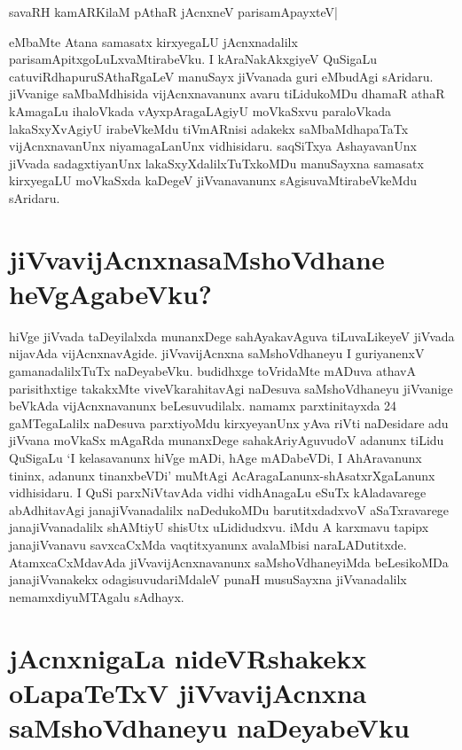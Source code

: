 \begin{shloka}
savaRH kamARKilaM pAthaR jAcnxneV parisamApayxteV|\label{78}
\end{shloka}

eMbaMte Atana samasatx kirxyegaLU jAcnxnadalilx parisamApitxgoLuLxvaMtirabeVku. I kAraNakAkxgiyeV QuSigaLu catuviRdhapuruSAthaRgaLeV manuSayx jiVvanada guri eMbudAgi sAridaru. jiVvanige saMbaMdhisida vijAcnxnavanunx avaru tiLidukoMDu dhamaR athaR kAmagaLu ihaloVkada vAyxpAragaLAgiyU moVkaSxvu paraloVkada lakaSxyXvAgiyU irabeVkeMdu tiVmARnisi adakekx saMbaMdhapaTaTx vijAcnxnavanUnx niyamagaLanUnx vidhisidaru. saqSiTxya AshayavanUnx jiVvada sadagxtiyanUnx lakaSxyXdalilxTuTxkoMDu manuSayxna samasatx kirxyegaLU moVkaSxda kaDegeV jiVvanavanunx sAgisuvaMtirabeVkeMdu sAridaru.

\section*{jiVvavijAcnxnasaMshoVdhane heVgAgabeVku?}

hiVge jiVvada taDeyilalxda munanxDege sahAyakavAguva tiLuvaLikeyeV jiVvada nijavAda vijAcnxnavAgide. jiVvavijAcnxna saMshoVdhaneyu I guriyanenxV gamanadalilxTuTx naDeyabeVku. budidhxge toVridaMte mADuva athavA parisithxtige takakxMte viveVkarahitavAgi naDesuva saMshoVdhaneyu jiVvanige beVkAda vijAcnxnavanunx beLesuvudilalx. namamx parxtinitayxda 24 gaMTegaLalilx naDesuva parxtiyoMdu kirxyeyanUnx yAva riVti naDesidare adu jiVvana moVkaSx mAgaRda munanxDege sahakAriyAguvudoV adanunx tiLidu QuSigaLu `I kelasavanunx hiVge mADi, hAge mADabeVDi, I AhAravanunx tininx, adanunx tinanxbeVDi' muMtAgi AcAragaLanunx-shAsatxrXgaLanunx vidhisidaru. I QuSi parxNiVtavAda vidhi vidhAnagaLu eSuTx kAladavarege abAdhitavAgi janajiVvanadalilx naDedukoMDu barutitxdadxvoV aSaTxravarege janajiVvanadalilx shAMtiyU shisUtx uLididudxvu. iMdu A‌ karxmavu tapipx janajiVvanavu savxcaCxMda vaqtitxyanunx avalaMbisi naraLADutitxde. AtamxcaCxMdavAda jiVvavijAcnxnavanunx saMshoVdhaneyiMda beLesikoMDa janajiVvanakekx odagisuvudariMdaleV punaH musuSayxna jiVvanadalilx nemamxdiyuMTAgalu sAdhayx. 

\section*{jAcnxnigaLa nideVRshakekx oLapaTeTxV jiVvavijAcnxna saMshoVdhaneyu naDeyabeVku}

